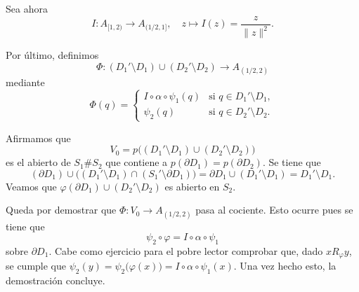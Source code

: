 {    Sea ahora 
    \[
    I : A_{[1, 2)} \to A_{(1/2, 1]},\quad z \mapsto I(z) = \frac{z}{\|z\|^2}.
    \]

    Por último, definimos 
    \[
    \Phi : (D_1' \setminus D_1) \cup (D_2' \setminus D_2) \to A_{(1/2, 2)}
    \]
    mediante
    \[
    \Phi(q) = 
    \begin{cases}
    I \circ \alpha \circ \psi_1(q) & \text{si } q \in D_1' \setminus D_1, \\
    \psi_2(q) & \text{si } q \in D_2' \setminus D_2.
    \end{cases}
    \]

    Afirmamos que 
    \[
    V_0 = p\big((D_1' \setminus D_1) \cup (D_2' \setminus D_2)\big)
    \]
    es el abierto de \(S_1 \# S_2\) que contiene a \(p(\partial D_1) = p(\partial D_2)\). Se tiene que 
    \[
    (\partial D_1)\cup \big((D_1' \setminus D_1) \cap (S_1' \setminus \partial D_1)\big) = \partial D_1 \cup (D_1' \setminus D_1) = D_1'\setminus D_1.
    \]
    Veamos que \(\varphi(\partial D_1) \cup (D_2'\setminus D_2) \) es abierto en \(S_2\).

    Queda por demostrar que 
    \(\Phi : V_0 \to A_{(1/2, 2)}\) pasa al cociente. Esto ocurre pues se tiene que 
    \[
    \psi_2 \circ \varphi = I \circ \alpha \circ \psi_1
    \]
    sobre \(\partial D_1\). Cabe como ejercicio para el pobre lector comprobar que, dado \(x R_\varphi y\), se cumple que \(\psi_2(y) = \psi_2\big(\varphi(x)\big) = I \circ \alpha \circ \psi_1(x)\). Una vez hecho esto, la demostración concluye.  
}
